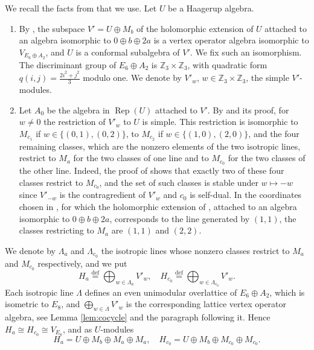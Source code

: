\documentclass[leqno]{article}
\newcommand{\Z}{\ensuremath{\mathbb{Z}}}
\newcommand{\ov}{\overset}
\DeclareMathOperator{\Rep}{Rep} %
\numberwithin{equation}{section}
\begin{document}
We recall the facts from \cite{Arh26} that we use. Let $U$ be a Haagerup algebra.
\begin{enumerate}
\item By \cite[Proposition 4.1]{Arh26}, the subspace $V' = U \oplus M_b$ of the holomorphic extension of $U$ attached to an algebra isomorphic to $0 \oplus b \oplus 2a$ is a vertex operator algebra isomorphic to $V_{E_6 \oplus A_2}$, and $U$ is a conformal subalgebra of $V'$. We fix such an isomorphism. The discriminant group of $E_6 \oplus A_2$ is $\Z_3 \times \Z_3$, with quadratic form $q(i,j) = \frac{2i^2+j^2}{3}$ modulo one. We denote by $V'_{w}$, $w \in \Z_3 \times \Z_3$, the simple $V'$-modules.
\item Let $A_0$ be the algebra in $\Rep(U)$ attached to $V'$. By \cite[Lemma 4.3]{Arh26} and its proof, for $w \neq 0$ the restriction of $V'_w$ to $U$ is simple. This restriction is isomorphic to $M_{c_1}$ if $w \in \{(0,1),(0,2)\}$, to $M_{c_2}$ if $w \in \{(1,0),(2,0)\}$, and the four remaining classes, which are the nonzero elements of the two isotropic lines, restrict to $M_a$ for the two classes of one line and to $M_{c_0}$ for the two classes of the other line. Indeed, the proof of \cite[Lemma 4.3]{Arh26} shows that exactly two of these four classes restrict to $M_{c_0}$, and the set of such classes is stable under $w \mapsto -w$ since $V'_{-w}$ is the contragredient of $V'_w$ and $c_0$ is self-dual. In the coordinates chosen in \cite[Section 4.2]{Arh26}, for which the holomorphic extension of \cite[Proposition 4.1]{Arh26}, attached to an algebra isomorphic to $0 \oplus b \oplus 2a$, corresponds to the line generated by $(1,1)$, the classes restricting to $M_a$ are $(1,1)$ and $(2,2)$.
\end{enumerate}
We denote by $\Lambda_a$ and $\Lambda_{c_0}$ the isotropic lines whose nonzero classes restrict to $M_a$ and $M_{c_0}$ respectively, and we put
\begin{equation}
\label{eq:Hx}
H_a \ov{\mathrm{def}}{=} \bigoplus_{w \in \Lambda_a} V'_w,\quad H_{c_0} \ov{\mathrm{def}}{=} \bigoplus_{w \in \Lambda_{c_0}} V'_w.
\end{equation}
Each isotropic line $\Lambda$ defines an even unimodular overlattice of $E_6 \oplus A_2$, which is isometric to $E_8$, and $\bigoplus_{w \in \Lambda} V'_w$ is the corresponding lattice vertex operator algebra, see Lemma \ref{lem:cocycle} and the paragraph following it. Hence $H_a \cong H_{c_0} \cong V_{E_8}$, and as $U$-modules
\begin{equation}
\label{eq:Hx-decomposition}
H_a = U \oplus M_b \oplus M_a \oplus M_a,\quad H_{c_0} = U \oplus M_b \oplus M_{c_0} \oplus M_{c_0}.
\end{equation}
\end{document}
